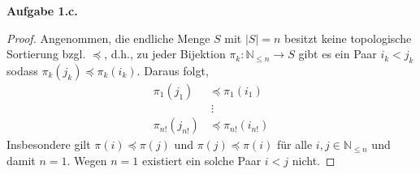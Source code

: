 \documentclass[12pt]{extarticle}
\newcommand{\aufgn}[1]{\textbf{Aufgabe #1.}}
\newcommand{\mg}[1]{\mathbb{#1}}
\begin{document}
\aufgn{1.c}
\begin{proof}
  Angenommen, die endliche Menge \(S\) mit
  \(\left| S \right| = n\) besitzt keine topologische
  Sortierung bzgl. \(\preceq\), d.h., zu jeder Bijektion
  \(\pi_k \colon \mg{N}_{\le n} \to S\) gibt es ein Paar
  \(i_k < j_k\) sodass \(\pi_k(j_k) \preceq \pi_k(i_k)\).
  Daraus folgt,
\begin{align*}
  \pi_1(j_1) &\preceq \pi_1(i_1) \\
  & \mathrel{\:\vdots} \\
  \pi_{n!}(j_{n!}) &\preceq \pi_{n!}(i_{n!})
\end{align*}
Insbesondere gilt \(\pi(i) \preceq \pi(j)\) und
\(\pi(j) \preceq \pi(i)\) für alle
\(i, j \in \mg{N}_{\le n}\) und damit \(n = 1\).  Wegen
\(n=1\) existiert ein solche Paar \(i < j\) nicht.
\end{proof}
\end{document}
